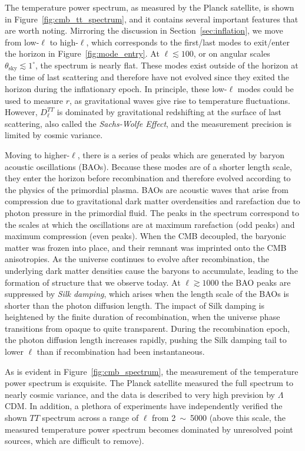 The temperature power spectrum, as measured by the Planck satellite, is shown in Figure~\ref{fig:cmb_tt_spectrum}, and it contains several important features that are worth noting. Mirroring the discussion in Section~\ref{sec:inflation}, we move from low-$\ell$ to high-$\ell$, which corresponds to the first/last modes to exit/enter the horizon in Figure~\ref{fig:mode_entry}. At $\ell \lesssim 100$, or on angular scales $\theta_{\mathrm{sky}} \lesssim 1^{\circ}$, the spectrum is nearly flat. These modes exist outside of the horizon at the time of last scattering and therefore have not evolved since they exited the horizon during the inflationary epoch. In principle, these low-$\ell$ modes could be used to measure $r$, as gravitational waves give rise to temperature fluctuations. However, $D_{\ell}^{TT}$ is dominated by gravitational redshifting at the surface of last scattering, also called the \textit{Sachs-Wolfe Effect}, and the measurement precision is limited by cosmic variance.

Moving to higher-$\ell$, there is a series of peaks which are generated by baryon acoustic oscillations (BAOs). Because these modes are of a shorter length scale, they enter the horizon before recombination and therefore evolved according to the physics of the primordial plasma. BAOs are acoustic waves that arise from compression due to gravitational dark matter overdensities and rarefaction due to photon pressure in the primordial fluid. The peaks in the spectrum correspond to the scales at which the oscillations are at maximum rarefaction (odd peaks) and maximum compression (even peaks). When the CMB decoupled, the baryonic matter was frozen into place, and their remnant was imprinted onto the CMB anisotropies. As the universe continues to evolve after recombination, the underlying dark matter densities cause the baryons to accumulate, leading to the formation of structure that we observe today. At $\ell \gtrsim 1000$ the BAO peaks are suppressed by \textit{Silk damping}, which arises when the length scale of the BAOs is shorter than the photon diffusion length. The impact of Silk damping is heightened by the finite duration of recombination, when the universe phase transitions from opaque to quite transparent. During the recombination epoch, the photon diffusion length increases rapidly, pushing the Silk damping tail to lower $\ell$ than if recombination had been instantaneous. 

As is evident in Figure~\ref{fig:cmb_spectrum}, the measurement of the temperature power spectrum is exquisite. The Planck satellite measured the full spectrum to nearly cosmic variance, and the data is described to very high prevision by $\Lambda$CDM. In addition, a plethora of experiments have independently verified the shown $TT$ spectrum across a range of $\ell$ from 2~$\sim$~5000 (above this scale, the measured temperature power spectrum becomes dominated by unresolved point sources, which are difficult to remove).

